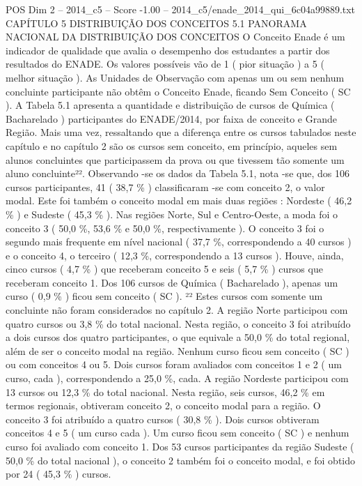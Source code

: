 \begin{textsample}{POS Dim 2 – 2014\_c5 – Score -1.00 – 2014\_c5/enade\_2014\_qui\_6c04a99889.txt}  \label{ex:f2_pos_309}
CAPÍTULO 5 DISTRIBUIÇÃO DOS CONCEITOS 5.1 PANORAMA NACIONAL DA DISTRIBUIÇÃO DOS CONCEITOS O Conceito Enade é um indicador de qualidade que avalia o desempenho dos estudantes a partir dos resultados do ENADE.
Os valores possíveis vão de 1 ( pior situação ) a 5 ( melhor situação ).
As Unidades de Observação com apenas um ou sem nenhum concluinte participante não obtêm o Conceito Enade, ficando Sem Conceito ( SC ).
A Tabela 5.1 apresenta a quantidade e distribuição de cursos de Química ( Bacharelado ) participantes do ENADE/2014, por faixa de conceito e Grande Região.
Mais uma vez, ressaltando que a diferença entre os cursos tabulados neste capítulo e no capítulo 2 são os cursos sem conceito, em princípio, aqueles sem alunos concluintes que participassem da prova ou que tivessem tão somente um aluno concluinte²².
Observando -se os dados da Tabela 5.1, nota -se que, dos 106 cursos participantes, 41 ( 38,7 \% ) classificaram -se com conceito 2, o valor modal.
Este foi também o conceito modal em mais duas regiões : Nordeste ( 46,2 \% ) e Sudeste ( 45,3 \% ).
Nas regiões Norte, Sul e Centro-Oeste, a moda foi o conceito 3 ( 50,0 \%, 53,6 \% e 50,0 \%, respectivamente ).
O conceito 3 foi o segundo mais frequente em nível nacional ( 37,7 \%, correspondendo a 40 cursos ) e o conceito 4, o terceiro ( 12,3 \%, correspondendo a 13 cursos ).
Houve, ainda, cinco cursos ( 4,7 \% ) que receberam conceito 5 e seis ( 5,7 \% ) cursos que receberam conceito 1.
Dos 106 cursos de Química ( Bacharelado ), apenas um curso ( 0,9 \% ) ficou sem conceito ( SC ). ²² Estes cursos com somente um concluinte não foram considerados no capítulo 2.
A região Norte participou com quatro cursos ou 3,8 \% do total nacional.
Nesta região, o conceito 3 foi atribuído a dois cursos dos quatro participantes, o que equivale a 50,0 \% do total regional, além de ser o conceito modal na região.
Nenhum curso ficou sem conceito ( SC ) ou com conceitos 4 ou 5.
Dois cursos foram avaliados com conceitos 1 e 2 ( um curso, cada ), correspondendo a 25,0 \%, cada.
A região Nordeste participou com 13 cursos ou 12,3 \% do total nacional.
Nesta região, seis cursos, 46,2 \% em termos regionais, obtiveram conceito 2, o conceito modal para a região.
O conceito 3 foi atribuído a quatro cursos ( 30,8 \% ).
Dois cursos obtiveram conceitos 4 e 5 ( um curso cada ).
Um curso ficou sem conceito ( SC ) e nenhum curso foi avaliado com conceito 1.
Dos 53 cursos participantes da região Sudeste ( 50,0 \% do total nacional ), o conceito 2 também foi o conceito modal, e foi obtido por 24 ( 45,3 \% ) cursos.

\end{textsample}

